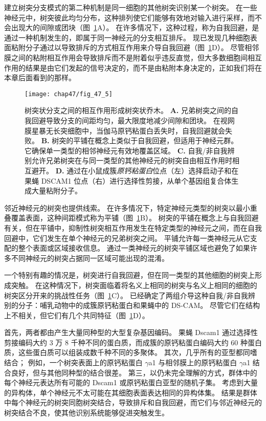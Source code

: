 建立树突分支模式的第二种机制是同一细胞的其他树突识别某一个树突。
在一些神经元中，树突彼此均匀分布，这种排列使它们能够有效地对输入进行采样，而不会出现大的间隙或团块（图~\ref{fig:47_5}A）。
在许多情况下，这种过程，称为自我回避，是通过一种机制发生的，即属于同一神经元的分支相互排斥。
现已发现几种细胞表面粘附分子通过以导致排斥的方式相互作用来介导自我回避（图~\ref{fig:47_5}D）。
尽管相邻膜之间的粘附相互作用会导致排斥而不是附着似乎违反直觉，但大多数细胞间相互作用的结果是由它们发起的信号决定的，而不是由粘附本身决定的，正如我们将在本章后面看到的那样。


\begin{figure}[htbp]
	\centering
	\texttt{[image: chap47/fig\_47\_5]}
	\caption{树突状分支之间的相互作用形成树突状乔木。
		\textbf{A.} 兄弟树突之间的自我回避导致分支的间距均匀，最大限度地减少间隙和团块。
		在视网膜星暴无长突细胞中，当伽马原钙粘蛋白丢失时，自我回避就会失败。
		\textbf{B.} 树突的平铺在概念上类似于自我回避，但适用于神经元群。
		它确保单一类型的相邻神经元有效地覆盖区域。
		\textbf{C.} 自我/非自我辨别允许兄弟树突在与同一类型的其他神经元的树突自由相互作用时相互避开。
		\textbf{D.} 通过在小鼠成簇\textit{原钙粘蛋白}位点（左）选择启动子和在果蝇 DSCAM1 位点（右）进行选择性剪接，从单个基因组复合体生成大量粘附分子。}
	\label{fig:47_5}
\end{figure}


邻近神经元的树突也提供线索。
在许多情况下，特定神经元类型的树突以最小重叠覆盖表面，这种间距模式称为平铺（图~\ref{fig:47_5}B）。
树突的平铺在概念上与自我回避有关，但在平铺中，抑制性树突相互作用发生在特定类型的神经元之间，而在自我回避中，它们发生在单个神经元的兄弟树突之间。
平铺允许每一类神经元从它支配的整个表面或区域接收信息。
通过一类神经元的树突平铺区域也避免了如果许多不同神经元的树突占据同一区域可能出现的混淆。


一个特别有趣的情况是，树突进行自我回避，但在同一类型的其他细胞的树突上形成突触。
在这种情况下，树突面临着将名义上相同的树突与名义上相同的细胞的树突区分开来的挑战性任务（图~\ref{fig:47_5}C）。
已经确定了两组介导这种自我/非自我辨别的分子：哺乳动物中的成簇原钙粘蛋白和果蝇中的 DS-CAM。
尽管它们在结构上不相关，但它们有几个共同特征（图~\ref{fig:47_5}D）。


首先，两者都由产生大量同种型的大型复杂基因编码。
果蝇 Dscam1 通过选择性剪接编码大约 3 万 8 千种不同的蛋白质，而成簇的原钙粘蛋白编码大约 60 种蛋白质，这些蛋白质可以组装成数千种不同的多聚体。
其次，几乎所有的亚型都同嗜结合；
例如，一个树突表面上的原钙粘蛋白 $\gamma$a1 与相邻膜上的原钙粘蛋白 $\gamma$a1 结合良好，但与其他同种型的结合很差。
第三，以仍未完全理解的方式，群体中的每个神经元表达所有可能的 Dscam1 或原钙粘蛋白亚型的随机子集。
考虑到大量的异构体，单个神经元不太可能在其细胞表面表达相同的异构体集。
结果是群体中每个神经元的树突同胞树突结合，导致排斥和自我回避，而它们与邻近神经元的树突结合不良，使其他识别系统能够促进突触发生。


